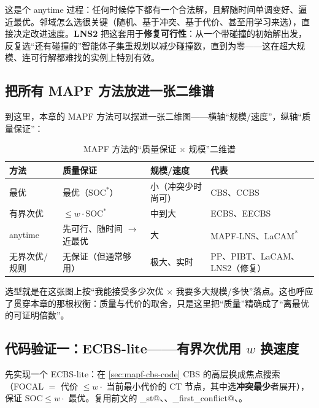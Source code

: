 这是个 anytime 过程：任何时候停下都有一个合法解，且解随时间单调变好、逼近最优。邻域怎么选很关键（随机、基于冲突、基于代价、甚至用学习来选），直接决定改进速度。\textbf{LNS2} 把这套用于\textbf{修复可行性}：从一个带碰撞的初始解出发，反复选“还有碰撞的”智能体子集重规划以减少碰撞数，直到为零——这在超大规模、连可行解都难找的实例上特别有效\cite{li2022lns2}。

\subsection{把所有 MAPF 方法放进一张二维谱}
\label{sec:mapf-2dspectrum}

到这里，本章的 MAPF 方法可以摆进一张二维图——横轴“规模/速度”，纵轴“质量保证”：

\begin{table}[H]\centering\small
\caption{MAPF 方法的“质量保证 $\times$ 规模”二维谱}
\label{tab:mapf-2d}
\begin{tabular}{llll}
\toprule
方法 & 质量保证 & 规模/速度 & 代表 \\
\midrule
最优 & 最优（$\mathrm{SOC}^*$） & 小（冲突少时尚可） & CBS、CCBS \\
有界次优 & $\le w\cdot\mathrm{SOC}^*$ & 中到大 & ECBS、EECBS \\
anytime & 先可行、随时间 $\to$ 近最优 & 大 & MAPF-LNS、LaCAM\textsuperscript{*} \\
无界次优/规则 & 无保证（但通常够用） & 极大、实时 & PP、PIBT、LaCAM、LNS2（修复） \\
\bottomrule
\end{tabular}
\end{table}

选型就是在这张图上按“我能接受多少次优 $\times$ 我要多大规模/多快”落点。这也呼应了贯穿本章的那根权衡：质量与代价的取舍，只是这里把“质量”精确成了“离最优的可证明倍数”。

\subsection{代码验证一：ECBS-lite——有界次优用 $w$ 换速度}
\label{sec:mapf-ecbs-code}

先实现一个 ECBS-lite：在 \cref{sec:mapf-cbs-code} CBS 的高层换成焦点搜索（FOCAL $=$ 代价 $\le w\cdot$ 当前最小代价的 CT 节点，其中选\textbf{冲突最少}者展开），保证 $\mathrm{SOC}\le w\cdot$ 最优。复用前文的 \verb@astar_st@、\verb@soc@、\verb@find_first_conflict@、\verb@pad@。

